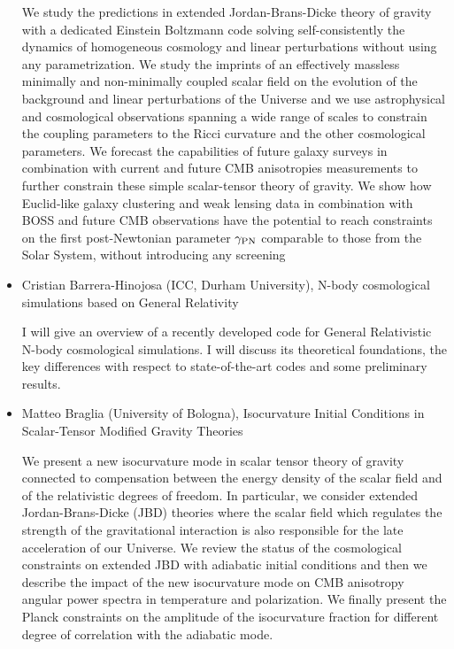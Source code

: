 \documentclass[letterpaper,12pt]{article}
\newcommand{\talk}[2]{{\fontspec{Lato Bold} #1,} {\fontspec{Lato Italic} #2}}
\begin{document}
\begin{itemize}
We study the predictions in extended Jordan-Brans-Dicke theory of gravity with a dedicated Einstein Boltzmann code solving self-consistently the dynamics of homogeneous cosmology and linear perturbations without using any parametrization. We study the imprints of an effectively massless minimally and non-minimally coupled scalar field on the evolution of the background and linear perturbations of the Universe and we use astrophysical and cosmological observations spanning a wide range of scales to constrain the coupling parameters to the Ricci curvature and the other cosmological parameters. We forecast the capabilities of future galaxy surveys in combination with current and future CMB anisotropies measurements to further constrain these simple scalar-tensor theory of gravity. We show how Euclid-like galaxy clustering and weak lensing data in combination with BOSS and future CMB observations have the potential to reach constraints on the first post-Newtonian parameter $\gamma_{\rm PN}$ comparable to those from the Solar System, without introducing any screening


\item \talk{Cristian Barrera-Hinojosa (ICC, Durham University)}{N-body cosmological simulations based on General Relativity}

I will give an overview of a recently developed code for General Relativistic N-body cosmological simulations. I will discuss its theoretical foundations, the key differences with respect to state-of-the-art codes and some preliminary results.


\item \talk{Matteo Braglia (University of Bologna)}{Isocurvature Initial Conditions in Scalar-Tensor Modified Gravity Theories}

We present a new isocurvature mode in scalar tensor theory of gravity connected to compensation between the energy density of the scalar field and of the relativistic degrees of freedom. In particular, we consider extended Jordan-Brans-Dicke (JBD) theories where the scalar field which regulates the strength of the gravitational interaction is also responsible for the late acceleration of our Universe. We review the status of the cosmological constraints on extended JBD with adiabatic initial conditions and then we describe the impact of the new isocurvature mode on CMB anisotropy angular power spectra in temperature and polarization. We finally present the Planck constraints on the amplitude of the isocurvature fraction for different degree of correlation with the adiabatic mode.



\end{itemize}
\end{document}
